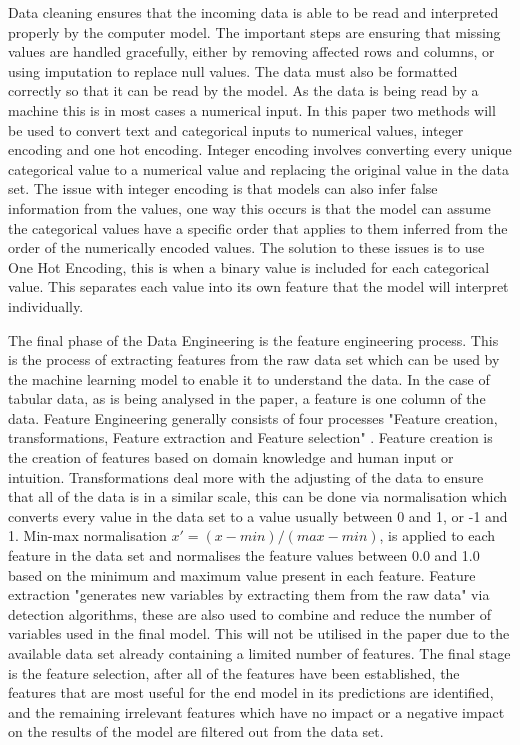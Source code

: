 \documentclass{imc-inf}
\begin{document}
	Data cleaning ensures that the incoming data is able to be read and interpreted properly by the computer model. The important steps are ensuring that missing values are handled gracefully, either by removing affected rows and columns, or using imputation to replace null values.
	The data must also be formatted correctly so that it can be read by the model. As the data is being read by a machine this is in most cases a numerical input. In this paper two methods will be used to convert text and categorical inputs to numerical values, integer encoding and one hot encoding. Integer encoding involves converting every unique categorical value to a numerical value and replacing the original value in the data set. The issue with integer encoding is that models can also infer false information from the values, one way this occurs is that the model can assume the categorical values have a specific order that applies to them inferred from the order of the numerically encoded values. The solution to these issues is to use One Hot Encoding, this is when a binary value is included for each categorical value. This separates each value into its own feature that the model will interpret individually.
	\newline
	
	The final phase of the Data Engineering is the feature engineering process. This is the process of extracting features from the raw data set which can be used by the machine learning model to enable it to understand the data. In the case of tabular data, as is being analysed in the paper, a feature is one column of the data. Feature Engineering generally consists of four processes "Feature creation, transformations, Feature extraction and Feature selection" \cite{website:JavaTPoint}. Feature creation is the creation of features based on domain knowledge and human input or intuition. Transformations deal more with the adjusting of the data to ensure that all of the data is in a similar scale, this can be done via normalisation which converts every value in the data set to a value usually between 0 and 1, or -1 and 1. Min-max normalisation $x' = (x - min) / (max - min)$, is applied to each feature in the data set and normalises the feature values between 0.0 and 1.0 based on the minimum and maximum value present in each feature. Feature extraction "generates new variables by extracting them from the raw data" \cite{website:JavaTPoint} via detection algorithms, these are also used to combine and reduce the number of variables used in the final model. This will not be utilised in the paper due to the available data set already containing a limited number of features. The final stage is the feature selection, after all of the features have been established, the features that are most useful for the end model in its predictions are identified, and the remaining irrelevant features which  have no impact or a negative impact on the results of the model are filtered out from the data set. 
	
\end{document}
